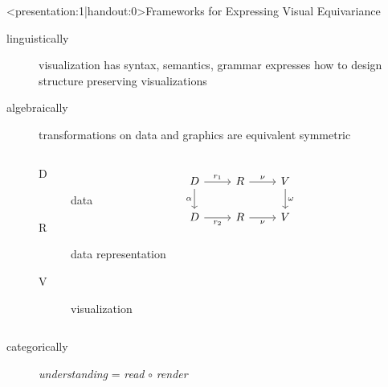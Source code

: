 \documentclass[xcolor={dvipsnames}, handout]{beamer}
\begin{document}
\begin{frame}<presentation:1|handout:0>{Frameworks for Expressing Visual Equivariance}
    \begin{description}
        \item[linguistically] visualization has syntax, semantics, grammar expresses how to design structure preserving visualizations
        \cite{mackinlayAutomatingDesignGraphical1986,mackinlayAUTOMATICDESIGNGRAPHICAL1987,wilkinsonGrammarGraphics2005}

        \item[algebraically] transformations on data and graphics are equivalent symmetric \cite{kindlmannAlgebraicProcessVisualization2014}
        \begin{columns}
            \begin{description}
                \item[D] data 
                \item[R] data representation 
                \item[V] visualization
            \end{description}
            \begin{equation*}
                \begin{tikzcd}[ampersand replacement=\&]
                    D \arrow[d, "\alpha"'] \arrow[r, "r_1"] \& R \arrow[r, "\nu"]  \& V \arrow[d, "\omega"] \\
                    D \arrow[r, "r_2"']                     \& R \arrow[r, "\nu"'] \& V                    
                \end{tikzcd}
                \end{equation*}
        \end{columns} 
    \item[categorically] \textit{understanding} = \textit{read} $\circ$ \textit{render} \cite{vickersUnderstandingVisualizationFormal2013}    
    \end{description}
\end{frame}
\end{document}
